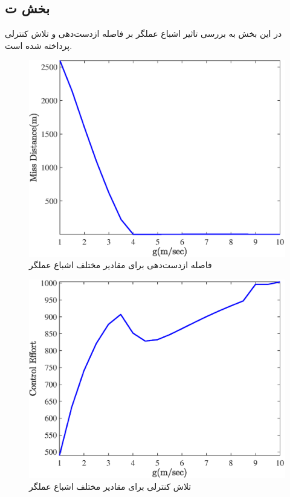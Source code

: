 \subsection{بخش ت}
در این بخش به بررسی تاثیر اشباع عملگر بر فاصله‌ ازدست‌دهی و تلاش کنترلی پرداخته شده است.

\begin{figure}[H]
	\centering
	\includegraphics[width=.75\linewidth]{../Figure/Q1/d/MD}
	\caption{فاصله ازدست‌دهی برای مقادیر مختلف اشباع عملگر}
\end{figure}

\begin{figure}[H]
	\centering
	\includegraphics[width=.75\linewidth]{../Figure/Q1/d/CE}
	\caption{تلاش کنترلی برای مقادیر مختلف اشباع عملگر}
\end{figure}